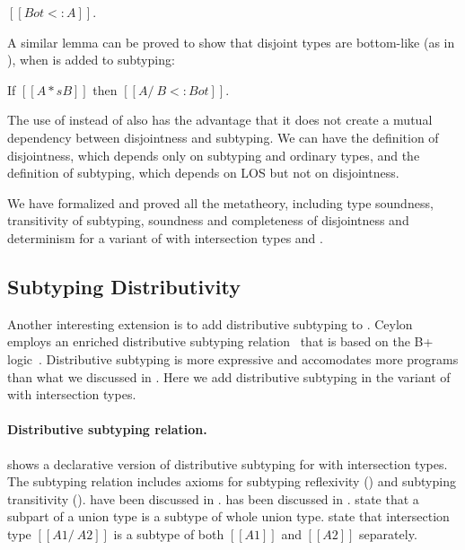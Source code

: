 \begin{lemma}
  $[[Bot <: A]]$.
\label{lemma:discussion:bls}
\end{lemma}

\noindent A similar lemma can be proved to show that disjoint types are bottom-like
(as in ), when  is added to subtyping:

\begin{lemma}
  If $[[A *s B]]$ then $[[A /\ B <: Bot]]$.
\label{lemma:discussion:disjoint-types}
\end{lemma}

\noindent The use of  instead of  also has
the advantage that it does not create a mutual dependency between
disjointness and subtyping. We can have the definition of
disjointness, which depends only on subtyping and ordinary types, and
the definition of subtyping, which depends on LOS but not on
disjointness.

We have formalized and proved all the metatheory, including
type soundness, transitivity of subtyping, soundness and completeness
of disjointness and determinism for a variant of \name with
intersection types and .

\subsection{Subtyping Distributivity}
\label{sec:inter:dist}

Another interesting extension is to add distributive subtyping to \cal.
Ceylon employs an enriched
distributive subtyping relation~\cite{muehlboeck2018empowering}
that is based on the
B+ logic~\cite{routley1972semantics,van2000minimal}.
Distributive subtyping is more expressive and accomodates more programs than what we discussed in
. Here we add distributive subtyping in the variant of \cal with
intersection types.

\paragraph{Distributive subtyping relation.}
 shows a declarative version of distributive subtyping for
\cal with intersection types.
The subtyping relation includes
axioms for subtyping reflexivity () and
subtyping transitivity ().  have been
discussed in .  has been discussed in .
 state that a subpart of a union type is a subtype of whole union type.
 state that intersection type $[[A1 /\ A2]]$ is a subtype of both $[[A1]]$
and $[[A2]]$ separately.

